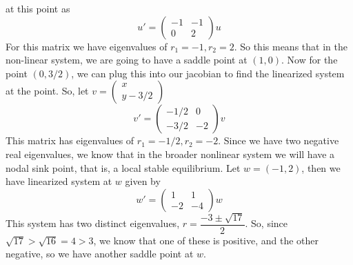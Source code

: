 \documentclass{article}
\theoremstyle{definition}
\begin{document}
        at this point as 
        \[
            u' = \begin{pmatrix}
                -1 & -1 \\
                0 & 2
            \end{pmatrix}   u 
        \]
        For this matrix we have eigenvalues of $r_1 = -1, r_2 = 2$.
        So this means that in the non-linear system, we are going to have a saddle point at 
        $(1,0)$. Now for the point $(0, 3/2)$, we can plug this into our jacobian to find the 
        linearized system at the point. So, let $v = \begin{pmatrix}
            x \\
            y - 3/2
        \end{pmatrix}$
        \[
            v' = \begin{pmatrix}
            -1/2 & 0 \\
            -3/2 & -2    
            \end{pmatrix}
            v
        \]
        This matrix has eigenvalues of $r_1 = -1/2, r_2 = -2$. Since we have two negative 
        real eigenvalues, we know that in the broader nonlinear system we will have a nodal sink 
        point, that is, a local stable equilibrium. Let $w = (-1,2)$, then we have linearized system 
        at $w$ given by 
        \[
            w' = \begin{pmatrix}
                1 & 1\\
                -2 & -4
            \end{pmatrix}   
            w
        \]
        This system has two distinct eigenvalues, $r = \dfrac{-3 \pm \sqrt{17}}{2}$.
        So, since $\sqrt{17} > \sqrt{16} = 4 > 3$, we know that one of these is positive,
        and the other negative, so we have another saddle point at $w$.
\end{document}
